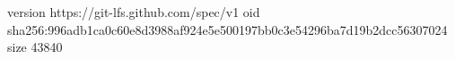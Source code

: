 version https://git-lfs.github.com/spec/v1
oid sha256:996adb1ca0c60e8d3988af924e5e500197bb0c3e54296ba7d19b2dcc56307024
size 43840
